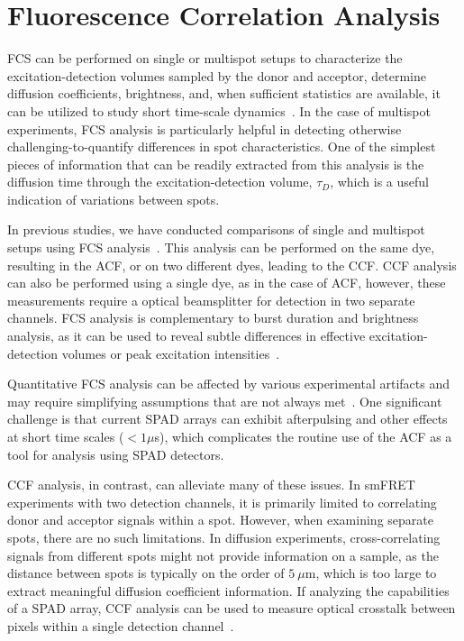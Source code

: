 \section{Fluorescence Correlation Analysis}
\label{sec:fcs_analysis_apdx}

\ac{FCS} can be performed on single or multispot setups to characterize the excitation-detection volumes sampled by the donor and acceptor, determine diffusion coefficients, brightness, and, when sufficient statistics are available, it can be utilized to study short time-scale dynamics~\cite{krichevsky_RPP_2002}. 
In the case of multispot experiments, \ac{FCS} analysis is particularly helpful in detecting otherwise challenging-to-quantify differences in spot characteristics. 
One of the simplest pieces of information that can be readily extracted from this analysis is the diffusion time through the excitation-detection volume, $\tau_D$, which is a useful indication of variations between spots.

In previous studies, we have conducted comparisons of single and multispot setups using FCS analysis~\cite{colyer_BOE_2010,ingargiola_PLOS1_2016, ingargiola_JCP_2018}. 
This analysis can be performed on the same dye, resulting in the \ac{ACF}, or on two different dyes, leading to the \ac{CCF}.
\ac{CCF} analysis can also be performed using a single dye, as in the case of \ac{ACF}, however, these measurements require a optical beamsplitter for detection in two separate channels.
\ac{FCS} analysis is complementary to burst duration and brightness analysis, as it can be used to reveal subtle differences in effective excitation-detection volumes or peak excitation intensities~\cite{ingargiola_PLOS1_2016}.

Quantitative \ac{FCS} analysis can be affected by various experimental artifacts and may require simplifying assumptions that are not always met~\cite{hess_BJ_2002, enderlein_CPB_2004}. 
One significant challenge is that current \ac{SPAD} arrays can exhibit afterpulsing and other effects at short time scales ($< 1 \mu$s), which complicates the routine use of the \ac{ACF} as a tool for analysis using \ac{SPAD} detectors.

\ac{CCF} analysis, in contrast, can alleviate many of these issues. 
In \ac{smFRET} experiments with two detection channels, it is primarily limited to correlating donor and acceptor signals within a spot. 
However, when examining separate spots, there are no such limitations. 
In diffusion experiments, cross-correlating signals from different spots might not provide information on a sample, as the distance between spots is typically on the order of $5~\mu$m, which is too large to extract meaningful diffusion coefficient information. 
If analyzing the capabilities of a \ac{SPAD} array, \ac{CCF} analysis can be used to measure optical crosstalk between pixels within a single detection channel~\cite{ingargiola_PLOS1_2016, ingargiola_NIMA_2018}.

